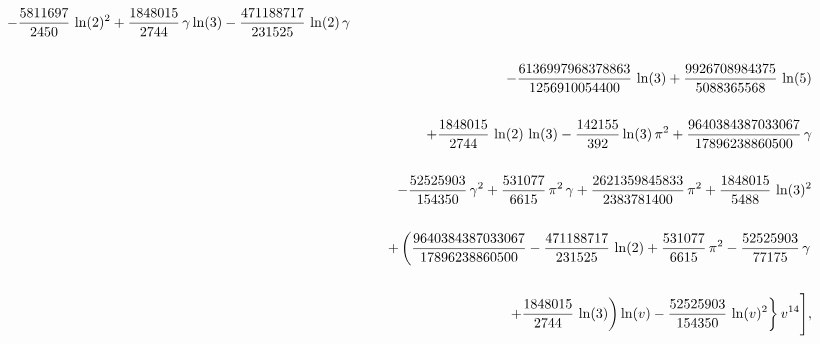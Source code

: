 \begin{eqnarray*}
 - {\displaystyle \frac {5811697}{2450}} \,\ln(2)^{2} + {\displaystyle \frac {1848015}{2744}} \,\gamma \,{\rm ln}(3) - {\displaystyle \frac {471188717}{231525}} \,\ln(2)\,\gamma  
\cr&&\cr&&\vspace{6pt}\hspace{0.6cm}
 - {\displaystyle \frac {6136997968378863}{1256910054400}} \,\ln(3) + {\displaystyle \frac {9926708984375}{5088365568}} \,\ln(5) 
\cr&&\cr&&\vspace{6pt}\hspace{0.6cm} 
+ {\displaystyle \frac {1848015}{2744}} \,\ln(2)\,\ln(3) - {\displaystyle \frac {142155}{392}} \,{\rm ln}(3)\,\pi ^{2} + {\displaystyle \frac {9640384387033067}{17896238860500}} \,\gamma  
\cr&&\cr&&\vspace{6pt}\hspace{0.6cm}
 - {\displaystyle \frac {52525903}{154350}} \,\gamma ^{2} + {\displaystyle \frac {531077}{6615}} \,\pi ^{2}\,\gamma  + {\displaystyle \frac {2621359845833}{2383781400}} \,\pi ^{2} + {\displaystyle \frac {1848015}{5488}} \,\ln(3)^{2} 
 \cr&&\cr&&\vspace{6pt}\hspace{0.6cm}
+ \left({\displaystyle \frac {9640384387033067}{17896238860500}}  - {\displaystyle \frac {471188717}{231525}} \,\ln(2) + {\displaystyle \frac {531077}{6615}} \,\pi ^{2} - {\displaystyle \frac {52525903}{77175}} \,\gamma  \right.
\cr&&\cr&&\left.\vspace{6pt}\hspace{0.6cm}
\left. + {\displaystyle \frac {1848015}{2744}} \,\ln(3)\right)\ln(v) 
- {\displaystyle \frac {52525903}{154350}} \,\ln(v)^{2} 
\right\} v^{14}\Biggr],
\end{eqnarray*}
